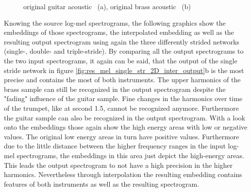 \begin{figure}[htb!]
    \centering
    \captionsetup{justification=centering}
    \caption{original guitar acoustic ~(a), original brass acoustic
    ~(b)}
    \label{fig:res_mel_original_guit_brass}
\end{figure}

Knowing the source log-mel spectrograms, the following graphics show the embeddings of those spectrograms, the interpolated embedding as well as the resulting output spectrogram using again the three differently strided networks (single-, double- and triple-stride). By comparing all the output spectrograms to the two input spectrograms, it again can be said, that the output of the single stride network in figure \ref{fig:res_mel_single_str_2D_inter_output}b is the most precise and contains the most of both instruments. The upper harmonics of the brass sample can still be recognized in the output spectrogram despite the "fading" influence of the guitar sample. Fine changes in the harmonics over time of the trumpet, like at second 1.5, cannot be recognized anymore. Furthermore the guitar sample can also be recognized in the output spectrogram. With a look onto the embeddings those again show the high energy areas with low or negative values. The original low energy areas in turn have positive values. Furthermore due to the little distance between the higher frequency ranges in the input log-mel spectrograms, the embeddings in this area just depict the high-energy areas. This leads the output spectrogram to not have a high precision in the higher harmonics. Nevertheless through interpolation the resulting embedding contains features of both instruments as well as the resulting spectrogram. 

